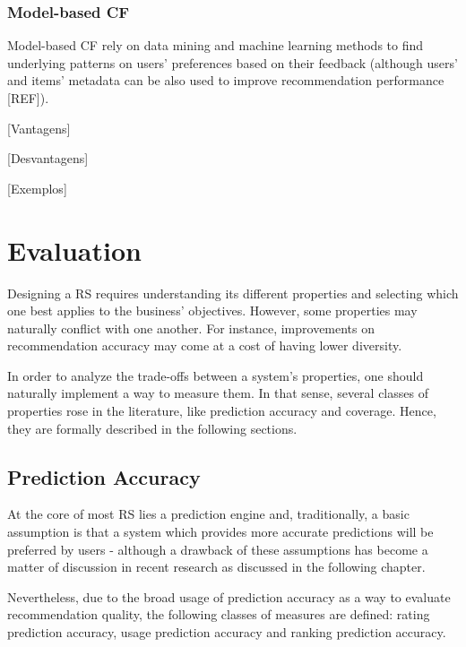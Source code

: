   \subsubsection{Model-based CF}

  Model-based CF rely on data mining and machine learning methods to find underlying patterns on 
  users' preferences based on their feedback (although users' and items' metadata can be also used to 
  improve recommendation performance [REF]). 

  [Vantagens]

  [Desvantagens]

  [Exemplos]




\section{Evaluation}



Designing a RS requires understanding its different properties and selecting which one best applies to the business' objectives. However, some properties may naturally conflict with one another. For instance, improvements on recommendation accuracy may come at a cost of having lower diversity. 

In order to analyze the trade-offs between a system's properties, one should naturally implement a way to measure them. In that sense, several classes of properties rose in the literature, like prediction accuracy and coverage. Hence, they are formally described in the following sections. 

\subsection{Prediction Accuracy}

At the core of most RS lies a prediction engine and, traditionally, a basic assumption is that a system which provides more accurate predictions will be preferred by users - although a drawback of these assumptions has become a matter of discussion in recent research as discussed in the following chapter. 

Nevertheless, due to the broad usage of prediction accuracy as a way to evaluate recommendation quality, the following classes of measures are defined: rating prediction accuracy, usage prediction accuracy and ranking prediction accuracy.


